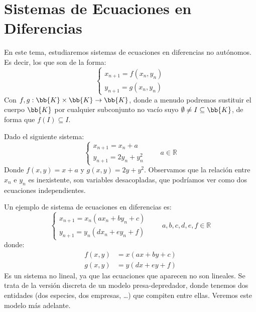 \chapter{Sistemas de Ecuaciones en Diferencias}

En este tema, estudiaremos sistemas de ecuaciones en diferencias no autónomos. Es decir, los que son de la forma:
\begin{equation*}\label{eq:sistemas_eq_dif}
    \left\{ 
    \begin{array}{l}
        x_{n+1} = f(x_n, y_n) \\
        y_{n+1} = g(x_n, y_n)
    \end{array}
    \right.
\end{equation*}
Con $f,g:\bb{K}\times \bb{K}\to \bb{K}$, donde a menudo podremos sustituir el cuerpo $\bb{K}$ por cualquier subconjunto no vacío suyo $\emptyset \neq I \subseteq \bb{K}$, de forma que $f(I) \subseteq I$.

\begin{ejemplo}
    Dado el siguiente sistema:
    \begin{equation*}
        \left\{\begin{array}{l}
                x_{n+1} = x_n + a \\
                y_{n+1} = 2y_n + y_n^2
        \end{array}\right. \qquad a \in \mathbb{R}
    \end{equation*}
    Donde $f(x,y) = x+a$ y $g(x,y) = 2y + y^2$. 
   Observamos que la relación entre $x_n$ e $y_n$ es inexistente, son variables desacopladas, que podríamos ver como dos ecuaciones independientes.
\end{ejemplo}

\begin{ejemplo}
    Un ejemplo de sistema de ecuaciones en diferencias es:
    \begin{equation*}
        \left\{\begin{array}{l}
                x_{n+1} = x_{n}(ax_n + by_n + c) \\
                y_{n+1} = y_{n}(dx_n + ey_n + f)
        \end{array}\right. \qquad a,b,c,d,e,f \in \mathbb{R}
    \end{equation*}
    donde:
    \begin{align*}
        f(x,y) &= x(ax + by + c) \\
        g(x,y) &= y(dx + ey + f)
    \end{align*}
    Es un sistema no lineal, ya que las ecuaciones que aparecen no son lineales.
    Se trata de la versión discreta de un modelo presa-depredador, donde tenemos dos entidades (dos especies, dos empresas, \ldots) que compiten entre ellas. Veremos este modelo más adelante.
\end{ejemplo}

